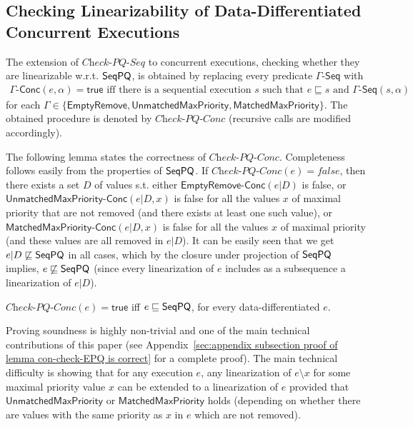 \subsection{Checking Linearizability of Data-Differentiated Concurrent Executions}\label{ssec:conc_exec}

The extension of $\textit{Check-PQ-Seq}$ to concurrent executions, checking whether they are linearizable w.r.t. $\mathsf{SeqPQ}$, is obtained by replacing every predicate $\Gamma\mathsf{\text{-}Seq}$ with
\begin{align*}
\Gamma\mathsf{\text{-}Conc}(e,\alpha) = \mathsf{true}\mbox{ iff there is a sequential execution $s$ such that $e\sqsubseteq s$ and $\Gamma\mathsf{\text{-}Seq}(s,\alpha)$}
\end{align*}
for each $\Gamma\in \{\mathsf{EmptyRemove}, \mathsf{UnmatchedMaxPriority}, \mathsf{MatchedMaxPriority}\}$. The obtained procedure is denoted by
$\textit{Check-PQ-Conc}$ (recursive calls are modified accordingly).


The following lemma states the correctness of $\textit{Check-PQ-Conc}$. Completeness follows easily from the properties of $\mathsf{SeqPQ}$. If $\textit{Check-PQ-Conc}(e) = \textit{false}$, then there exists a set $D$ of values s.t. either  $\mathsf{EmptyRemove\text{-}Conc}(e \vert D)$ is false, or $\mathsf{UnmatchedMaxPriority\text{-}Conc}(e \vert D,x)$ is false for all the values $x$ of maximal priority that are not removed (and there exists at least one such value), or $\mathsf{MatchedMaxPriority\text{-}Conc}(e \vert D,x)$ is false for all the values $x$ of maximal priority (and these values are all removed in $e \vert D$). It can be easily seen that we get $e \vert D\not\sqsubseteq \mathsf{SeqPQ}$ in all cases, which by the closure under projection of $\mathsf{SeqPQ}$ implies, $e \not\sqsubseteq \mathsf{SeqPQ}$ (since every linearization of $e$ includes as a subsequence a linearization of $e \vert D$).

\begin{lemma}\label{lemma:con-check-EPQ is correct}
$\textit{Check-PQ-Conc}(e)=\mathsf{true}$ iff $e \sqsubseteq \mathsf{SeqPQ}$, for every data-differentiated $e$.
\end{lemma}


Proving soundness is highly non-trivial and one of the main technical contributions of this paper (see Appendix~\ref{sec:appendix subsection proof of lemma con-check-EPQ is correct} for a complete proof). The main technical difficulty is showing that for any execution $e$, any linearization of $e\setminus x$ for some maximal priority value $x$ can be extended to a linearization of $e$ provided that $\mathsf{UnmatchedMaxPriority}$ or $\mathsf{MatchedMaxPriority}$ holds (depending on whether there are values with the same priority as $x$ in $e$ which are not removed).



